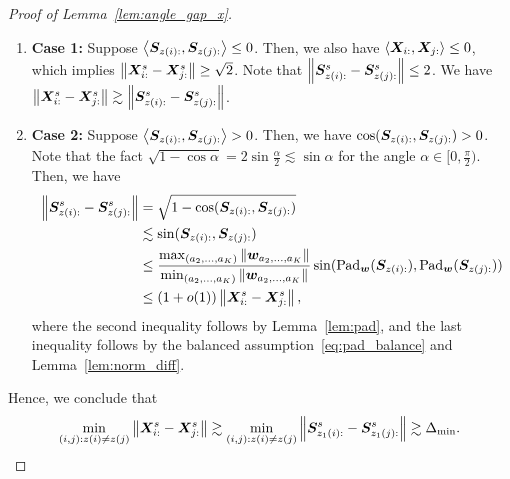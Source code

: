 \documentclass[lettersize,journal]{IEEEtran}
\theoremstyle{definition}
\newtheorem{lem}{Lemma}
\theoremstyle{definition}
\newcommand{\ang}[1]{\left\langle#1\right\rangle}
\begin{document}
\begin{proof}[Proof of Lemma~\ref{lem:angle_gap_x}]
\begin{enumerate}
    \item \textbf{Case 1:} Suppose $\ang{\mS_{z(i):}, \mS_{z(j):}} \leq 0$. Then, we also have $\ang{\mX_{i:},\mX_{j:}} \leq 0$, which implies $\left\lVert\bm X_{i:}^s -  \bm X_{j:}^s\right\rVert \geq \sqrt{2}$. Note that $\left\lVert\bm S_{z(i):}^s - \bm S_{z(j):}^s\right\rVert \leq 2$. We have $\left\lVert\bm X_{i:}^s -  \bm X_{j:}^s\right\rVert \gtrsim \left\lVert\bm S_{z(i):}^s - \bm S_{z(j):}^s\right\rVert$.
    \item \textbf{Case 2:} Suppose $\ang{\mS_{z(i):}, \mS_{z(j):}} > 0$. Then, we have $\cos(\bm S_{z(i):}, \bm S_{z(j):}) > 0$. Note that the fact $\sqrt{1 - \cos \alpha} = 2 \sin \frac{\alpha}{2} \lesssim \sin \alpha$ for the angle $\alpha \in [0, \frac{\pi}{2})$. Then, we have 
    \begin{align}
        \left\lVert\bm S_{z(i):}^s - \bm S_{z(j):}^s\right\rVert &= \sqrt{ 1 - \cos(\bm S_{z(i):}, \bm S_{z(j):})}  \\
        & \lesssim \sin (\bm S_{z(i):}, \bm S_{z(j):})\\
        & \leq \frac{ \max_{(a_2,\ldots, a_K)} \left\lVert\bm{w}_{a_2,\ldots, a_K}\right\rVert }{  \min_{(a_2,\ldots, a_K)} \left\lVert\bm{w}_{a_2,\ldots, a_K}\right\rVert }  \sin ( \text{Pad}_{\bm{w}} (\bm S_{z(i):}), \text{Pad}_{\bm{w}}(\bm S_{z(j):})) \\
        & \leq (1 + o(1)) \left\lVert\bm X_{i:}^s -  \bm X_{j:}^s\right\rVert,
    \end{align}
    where the second inequality follows by Lemma~\ref{lem:pad}, and the last inequality follows by the balanced assumption~\eqref{eq:pad_balance} and Lemma~\ref{lem:norm_diff}.
\end{enumerate}

Hence, we conclude that 
\begin{equation}
   \min_{(i,j): z(i) \neq z(j)} \left\lVert\bm X_{i:}^s - \bm X_{j:}^s\right\rVert \gtrsim \min_{(i,j): z(i) \neq z(j)}  \left\lVert\bm S_{z_1(i):}^s - \bm S_{z_1(j):}^s\right\rVert \gtrsim  \Delta_{\min}.
\end{equation}

\end{proof}

\end{document}
